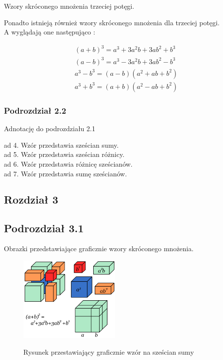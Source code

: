 \documentclass[11pt]{article}
\begin{document}
\begin{center}
Wzory skróconego mnożenia trzeciej potęgi.
\end{center}
\begin{flushleft}
Ponadto istnieją również wzory skróconego mnożenia dla trzeciej potęgi.\\
A wyglądają one następująco :
\begin{flushleft}
\begin{eqnarray}
(a+b)^3 = a^3 + 3a^2b + 3ab^2 + b^3\\
(a-b)^3 = a^3 - 3a^2b + 3ab^2 - b^3\\
a^3 - b^3 = (a-b)(a^2+ab+b^2)\\
a^3 + b^3 = (a+b)(a^2-ab+b^2)
\end{eqnarray}
\end{flushleft}
\end{flushleft}
\begin{center}
\subsubsection{Podrozdział 2.2}
\end{center}
\begin{center}
Adnotację do podrozdziału 2.1
\end{center}
ad 4. Wzór przedstawia sześcian sumy.\\
ad 5. Wzór przedstawia sześcian różnicy.\\
ad 6. Wzór przedstawia różnicę sześcianów.\\
ad 7. Wzór przedstawia sumę sześcianów.\\
\newpage
\begin{center}
\section{Rozdział 3}
\subsection{Podrozdział 3.1}
\end{center}
\begin{center}
Obrazki przedstawiające graficznie wzory skróconego mnożenia.
\end{center}
\begin{figure}[ht]
\begin{center}
\label{2}
\includegraphics[width=5cm]{d.png}
\caption{Rysunek przestawiający graficznie wzór na sześcian sumy}
\label{rys_model}
\end{center}
\end{figure}
\end{document}
